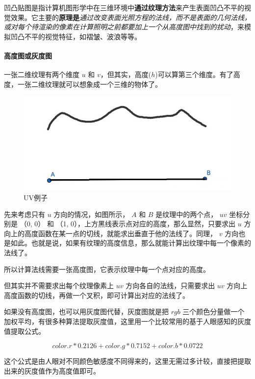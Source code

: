 \documentclass[UTF8,a4paper,12pt]{ctexbook}
\begin{document}
		凹凸贴图是指计算机图形学中在三维环境中\textbf{通过纹理方法}来产生表面凹凸不平的视觉效果。它主要的\textbf{原理是}\textit{通过改变表面光照方程的法线，而不是表面的几何法线，或对每个待渲染的像素在计算照明之前都要加上一个从高度图中找到的扰动}，来模拟凹凸不平的视觉特征，如褶皱、波浪等等。	
		
			\paragraph{高度图或灰度图}
				一张二维纹理有两个维度 $u$ 和 $v$，但其实，高度($h$)可以算第三个维度。有了高度，一张二维纹理就可以想象成一个三维的物体了。
					\begin{figure}[H]
						\centering
						\includegraphics[scale=0.54]{norMap}
						\caption{UV例子}
					\end{figure}
				
				先来考虑只有 $u$ 方向的情况，如图所示， $A$ 和 $B$ 是纹理中的两个点， $uv$ 坐标分别是 （0, 0） 和 （1, 0），上方黑线表示点对应的高度，那么显然，只要求出 $u$ 方向上的高度函数在某一点的切线，就能求出垂直于他的法线了。同理， $v$ 方向也是如此。也就是说，如果有纹理的高度信息，那么就能计算出纹理中每一个像素的法线了。
				
				所以计算法线需要一张高度图，它表示纹理中每一个点对应的高度。
				
				但其实并不需要求出每个纹理像素上 $uv$ 方向各自的法线，只需要求出 $uv$ 方向上高度函数的切线，再做一个叉积，即可计算出对应的法线了。
				
				如果没有高度图，也可以用灰度图代替，灰度图就是把 $rgb$ 三个颜色分量做一个加权平均，有很多种算法提取灰度值，这里用一个比较常用的基于人眼感知的灰度值提取公式。
				
				$$color.r * 0.2126 + color.g * 0.7152 + color.b * 0.0722$$
				
				这个公式是由人眼对不同颜色敏感度不同得来的，这里无需过多计较，直接把提取出来的灰度值作为高度值即可。
				
\end{document}
